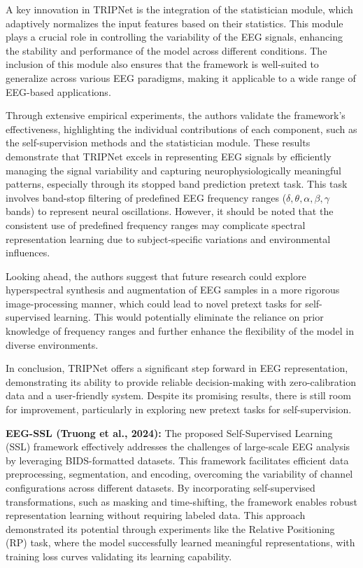 A key innovation in TRIPNet is the integration of the statistician module, which adaptively normalizes the input features based on their statistics. This module plays a crucial role in controlling the variability of the EEG signals, enhancing the stability and performance of the model across different conditions. The inclusion of this module also ensures that the framework is well-suited to generalize across various EEG paradigms, making it applicable to a wide range of EEG-based applications.

Through extensive empirical experiments, the authors validate the framework's effectiveness, highlighting the individual contributions of each component, such as the self-supervision methods and the statistician module. These results demonstrate that TRIPNet excels in representing EEG signals by efficiently managing the signal variability and capturing neurophysiologically meaningful patterns, especially through its stopped band prediction pretext task. This task involves band-stop filtering of predefined EEG frequency ranges ($\delta, \theta, \alpha, \beta, \gamma$ bands) to represent neural oscillations. However, it should be noted that the consistent use of predefined frequency ranges may complicate spectral representation learning due to subject-specific variations and environmental influences.

Looking ahead, the authors suggest that future research could explore hyperspectral synthesis and augmentation of EEG samples in a more rigorous image-processing manner, which could lead to novel pretext tasks for self-supervised learning. This would potentially eliminate the reliance on prior knowledge of frequency ranges and further enhance the flexibility of the model in diverse environments.

In conclusion, TRIPNet offers a significant step forward in EEG representation, demonstrating its ability to provide reliable decision-making with zero-calibration data and a user-friendly system. Despite its promising results, there is still room for improvement, particularly in exploring new pretext tasks for self-supervision.

\vspace{0.5em}
\textbf{EEG-SSL (Truong et al., 2024):}
The proposed Self-Supervised Learning (SSL) framework effectively addresses the challenges of large-scale EEG analysis by leveraging BIDS-formatted datasets. This framework facilitates efficient data preprocessing, segmentation, and encoding, overcoming the variability of channel configurations across different datasets. By incorporating self-supervised transformations, such as masking and time-shifting, the framework enables robust representation learning without requiring labeled data. This approach demonstrated its potential through experiments like the Relative Positioning (RP) task, where the model successfully learned meaningful representations, with training loss curves validating its learning capability.

